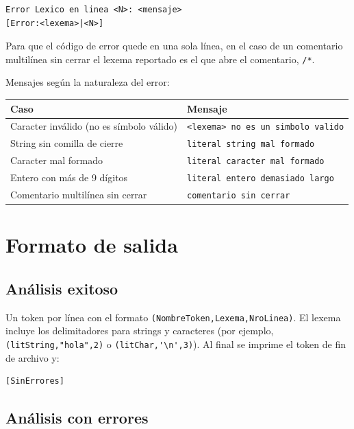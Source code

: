 \documentclass[11pt,a4paper]{article}
\begin{document}
\begin{verbatim}
Error Lexico en linea <N>: <mensaje>
[Error:<lexema>|<N>]
\end{verbatim}

Para que el código de error quede en una sola línea, en el caso de un comentario
multilínea sin cerrar el lexema reportado es el que abre el comentario, \texttt{/*}.

Mensajes según la naturaleza del error:

\begin{center}
\begin{tabular}{|l|l|}
\hline
\textbf{Caso} & \textbf{Mensaje} \\ \hline
Caracter inválido (no es símbolo válido) & \texttt{<lexema> no es un simbolo valido} \\ \hline
String sin comilla de cierre & \texttt{literal string mal formado} \\ \hline
Caracter mal formado & \texttt{literal caracter mal formado} \\ \hline
Entero con más de 9 dígitos & \texttt{literal entero demasiado largo} \\ \hline
Comentario multilínea sin cerrar & \texttt{comentario sin cerrar} \\ \hline
\end{tabular}
\end{center}

\section{Formato de salida}

\subsection{Análisis exitoso}

Un token por línea con el formato \texttt{(NombreToken,Lexema,NroLinea)}. El lexema incluye los
delimitadores para strings y caracteres (por ejemplo, \texttt{(litString,"hola",2)} o
\verb!(litChar,'\n',3)!). Al final se imprime el token de fin de archivo y:

\begin{verbatim}
[SinErrores]
\end{verbatim}

\subsection{Análisis con errores}
\end{document}
